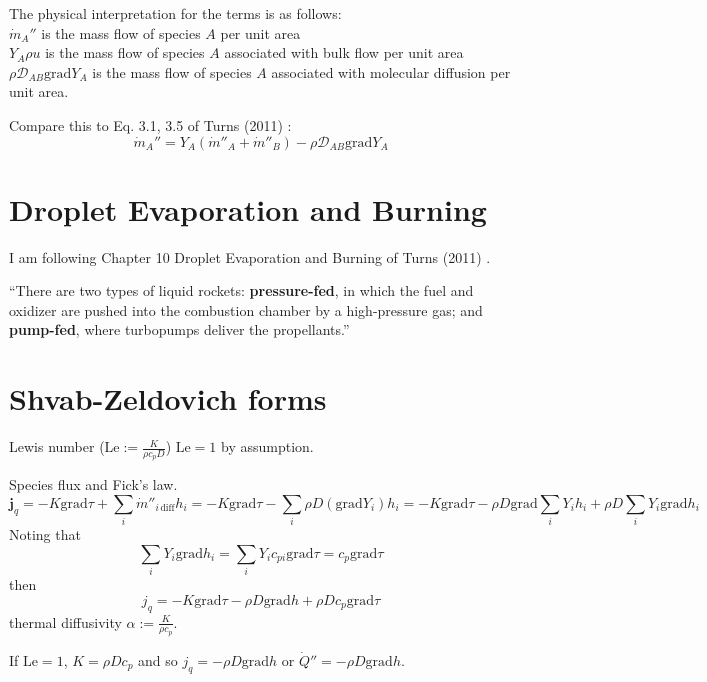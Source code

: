 \documentclass[10pt]{amsart}
\begin{document}
\begin{multicols*}{2}
The physical interpretation for the terms is as follows: \\
$\dot{m}_A''$ is the mass flow of species $A$ per unit area \\
$Y_A \rho u$ is the mass flow of species $A$ associated with bulk flow per unit area \\
$\rho \mathcal{D}_{AB} \text{grad}Y_A$ is the mass flow of species $A$ associated with molecular diffusion per unit area.  

Compare this to Eq. 3.1, 3.5 of Turns (2011) \cite{STurns2011}: 
\begin{equation}
\dot{m}_A'' = Y_A(\dot{m}''_A + \dot{m}''_B) - \rho \mathcal{D}_{AB} \text{grad}Y_A
\end{equation}

\section{Droplet Evaporation and Burning}



I am following Chapter 10 Droplet Evaporation and Burning of Turns (2011) \cite{STurns2011}.  

``There are two types of liquid rockets: \textbf{pressure-fed}, in which the fuel and oxidizer are pushed into the combustion chamber by a high-pressure gas; and \textbf{pump-fed}, where turbopumps deliver the propellants.''\cite{STurns2011}






\section{Shvab-Zeldovich forms}

Lewis number ($\text{Le} := \frac{K}{\rho c_p D }$) $\text{Le}=1$ by assumption.  

Species flux and Fick's law.  
\[
\mathbf{j}_q = -K \text{grad}\tau + \sum_i \dot{m}''_{i \, \text{diff}} h_i = -K\text{grad}\tau - \sum_i \rho D(\text{grad}Y_i)h_i = -K\text{grad}\tau - \rho D\text{grad} \sum_i Y_i h_i + \rho D \sum_i Y_i \text{grad}h_i
\]
Noting that 
\[
\sum_i Y_i \text{grad}h_i = \sum_i Y_i c_{pi} \text{grad}\tau = c_p \text{grad}\tau
\]
then
\[
j_q = -K \text{grad}\tau - \rho D \text{grad} h + \rho D c_p \text{grad}\tau
\]
thermal diffusivity $\alpha := \frac{K}{\rho c_p}$.  

If $\text{Le}=1$, $K= \rho Dc_p$ and so $j_q = -\rho D\text{grad}h$ or $\dot{Q}'' = -\rho D\text{grad}h$.  




\end{multicols*}
\end{document}
